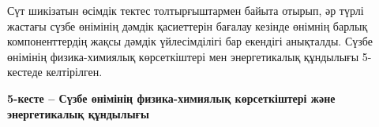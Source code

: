 Сүт шикізатын өсімдік тектес толтырғыштармен байыта отырып, әр түрлі
жастағы сүзбе өнімінің дәмдік қасиеттерін бағалау кезінде өнімнің барлық
компоненттердің жақсы дәмдік үйлесімділігі бар екендігі анықталды. Сүзбе
өнімінің физика-химиялық көрсеткіштері мен энергетикалық құндылығы
5-кестеде келтірілген.

{\bfseries 5-кесте -- Сүзбе өнімінің физика-химиялық көрсеткіштері және
энергетикалық құндылығы}


